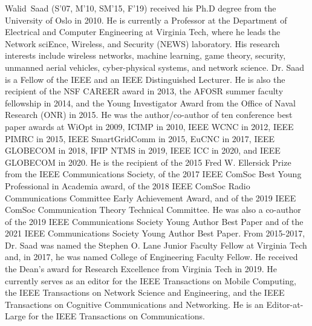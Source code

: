 \documentclass[conference]{IEEEtran}
\begin{document}
\vspace{-0.21cm}

\begin{IEEEbiography}
Walid~Saad (S’07, M’10, SM’15, F’19) received his Ph.D degree from the University of Oslo in 2010. He is currently a Professor at the Department of Electrical and Computer Engineering at Virginia Tech, where he leads the Network sciEnce, Wireless, and Security (NEWS) laboratory. His research interests include wireless networks, machine learning, game theory, security, unmanned aerial vehicles, cyber-physical systems, and network science. Dr. Saad is a Fellow of the IEEE and an IEEE Distinguished Lecturer. He is also the recipient of the NSF CAREER award in 2013, the AFOSR summer faculty fellowship in 2014, and the Young Investigator Award from the Office of Naval Research (ONR) in 2015. He was the author/co-author of ten conference best paper awards at WiOpt in 2009, ICIMP in 2010, IEEE WCNC in 2012, IEEE PIMRC in 2015, IEEE SmartGridComm in 2015, EuCNC in 2017, IEEE GLOBECOM in 2018, IFIP NTMS in 2019, IEEE ICC in 2020, and IEEE GLOBECOM in 2020. He is the recipient of the 2015 Fred W. Ellersick Prize from the IEEE Communications Society, of the 2017 IEEE ComSoc Best Young Professional in Academia award, of the 2018 IEEE ComSoc Radio Communications Committee Early Achievement Award, and of the 2019 IEEE ComSoc Communication Theory Technical Committee. He was also a co-author of the 2019 IEEE Communications Society Young Author Best Paper and of the 2021 IEEE Communications Society Young Author Best Paper. From 2015-2017, Dr. Saad was named the Stephen O. Lane Junior Faculty Fellow at Virginia Tech and, in 2017, he was named College of Engineering Faculty Fellow. He received the Dean's award for Research Excellence from Virginia Tech in 2019. He currently serves as an editor for the IEEE Transactions on Mobile Computing, the IEEE Transactions on Network Science and Engineering, and the IEEE Transactions on Cognitive Communications and Networking. He is an Editor-at-Large for the IEEE Transactions on Communications.
\end{IEEEbiography}
\vfill
\end{document}
